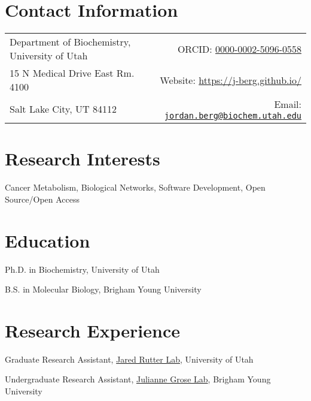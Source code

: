 \documentclass[margin,line]{res}
\begin{document}

\begin{resume}
\section{\sc Contact Information}
\vspace{.05in}
\hspace{-0.1in}
\begin{tabular}{lr}
Department of Biochemistry, University of Utah
  & \hspace{1.05in} \hfill
    ORCID: \href{https://orcid.org/0000-0002-5096-0558}{0000-0002-5096-0558}  \\
15 N Medical Drive East Rm. 4100
  & \hfill
    Website: \href{https://j-berg.github.io/}{https://j-berg.github.io/} \\
Salt Lake City, UT 84112
  & \hfill
    Email: \href{mailto:jordan.berg@biochem.utah.edu}{\nolinkurl{jordan.berg@biochem.utah.edu}} \\

\end{tabular}


\section{\sc Research Interests}
Cancer Metabolism, Biological Networks, Software Development, Open Source/Open Access


\section{\sc Education}
\begin{description}[style=multiline, leftmargin=2.2cm, font=\normalfont]
\item[2016-present] Ph.D. in Biochemistry, University of Utah
\item[2010-2016] B.S. in Molecular Biology, Brigham Young University
\end{description}


\section{\sc Research Experience}
\begin{description}[style=multiline, leftmargin=2.2cm, font=\normalfont]
\item[2016-present] Graduate Research Assistant, \href{http://rutter.biochem.utah.edu/}{Jared Rutter Lab}, University of Utah
\item[2013-2016] Undergraduate Research Assistant, \href{https://mmbio.byu.edu/grose-lab}{Julianne Grose Lab}, Brigham Young University
\end{description}



\end{resume}
\end{document}
